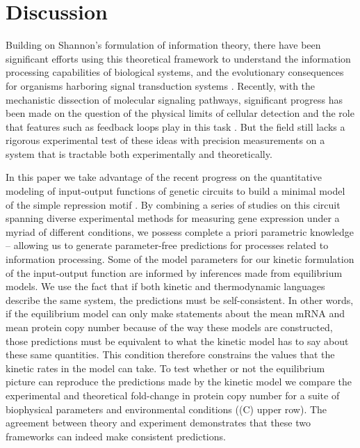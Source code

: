 \section*{Discussion}

Building on Shannon's formulation of information theory, there have been
significant efforts using this theoretical framework to understand the
information processing capabilities of biological systems, and the evolutionary
consequences for organisms harboring signal transduction systems
\cite{Bergstrom2004, Taylor2007, Tkacik2008, Polani2009, Nemenman2010,
Rivoire2011}. Recently, with the mechanistic dissection of molecular signaling
pathways, significant progress has been made on the question of the physical
limits of cellular detection and the role that features such as feedback loops
play in this task \cite{Bialek2005, Libby2007, Tkacik2011, Rhee2012a,
Voliotis2014a}. But the field still lacks a rigorous experimental test of these
ideas with precision measurements on a system that is tractable both
experimentally and theoretically.

In this paper we take advantage of the recent progress on the quantitative
modeling of input-output functions of genetic circuits to build a minimal model
of the simple repression motif \cite{Phillips2019}. By combining a series of
studies on this circuit spanning diverse experimental methods for measuring
gene expression under a myriad of different conditions, we possess complete a
priori parametric knowledge -- allowing us to generate parameter-free
predictions for processes related to information processing. Some of the model
parameters for our kinetic formulation of the input-output function are
informed by inferences made from equilibrium models. We use the fact that if
both kinetic and thermodynamic languages describe the same system, the
predictions must be self-consistent. In other words, if the equilibrium model
can only make statements about the mean mRNA and mean protein copy number
because of the way these models are constructed, those predictions must be
equivalent to what the kinetic model has to say about these same quantities.
This condition therefore constrains the values that the kinetic rates in the
model can take. To test whether or not the equilibrium picture can reproduce
the predictions made by the kinetic model we compare the experimental and
theoretical fold-change in protein copy number for a suite of biophysical
parameters and environmental conditions ((C) upper row).
The agreement between theory and experiment demonstrates that these two
frameworks can indeed make consistent predictions.

